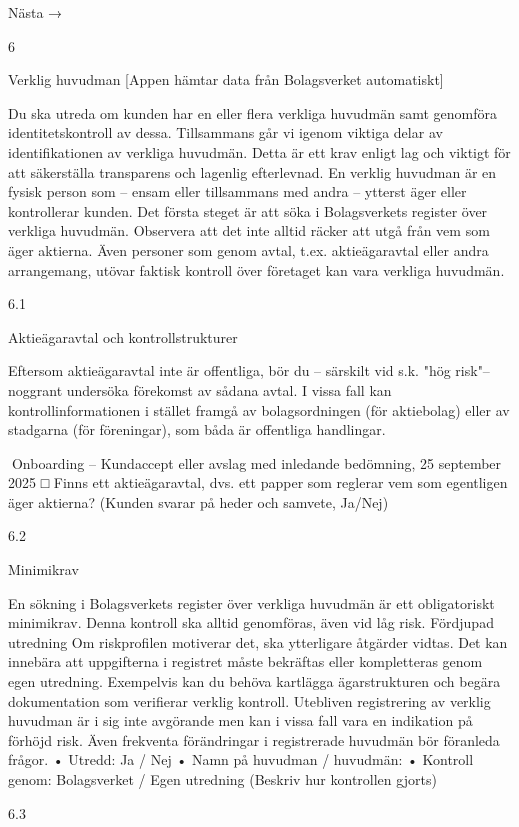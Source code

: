 Nästa →

6

Verklig huvudman [Appen hämtar data från Bolagsverket automatiskt]

Du ska utreda om kunden har en eller flera verkliga huvudmän samt genomföra identitetskontroll av dessa. Tillsammans går vi igenom viktiga delar av identifikationen av verkliga
huvudmän. Detta är ett krav enligt lag och viktigt för att säkerställa transparens och
lagenlig efterlevnad.
En verklig huvudman är en fysisk person som – ensam eller tillsammans med andra
– ytterst äger eller kontrollerar kunden. Det första steget är att söka i Bolagsverkets
register över verkliga huvudmän.
Observera att det inte alltid räcker att utgå från vem som äger aktierna. Även personer
som genom avtal, t.ex. aktieägaravtal eller andra arrangemang, utövar faktisk kontroll över
företaget kan vara verkliga huvudmän.

6.1

Aktieägaravtal och kontrollstrukturer

Eftersom aktieägaravtal inte är offentliga, bör du – särskilt vid s.k. "hög risk"– noggrant
undersöka förekomst av sådana avtal. I vissa fall kan kontrollinformationen i stället framgå av bolagsordningen (för aktiebolag) eller av stadgarna (för föreningar), som båda är
offentliga handlingar.

Onboarding – Kundaccept eller avslag med inledande bedömning,
25 september 2025
□ Finns ett aktieägaravtal, dvs. ett papper som reglerar vem som egentligen äger aktierna?
(Kunden svarar på heder och samvete, Ja/Nej)

6.2

Minimikrav

En sökning i Bolagsverkets register över verkliga huvudmän är ett obligatoriskt minimikrav. Denna kontroll ska alltid genomföras, även vid låg risk.
Fördjupad utredning
Om riskprofilen motiverar det, ska ytterligare åtgärder vidtas. Det kan innebära att
uppgifterna i registret måste bekräftas eller kompletteras genom egen utredning. Exempelvis kan du behöva kartlägga ägarstrukturen och begära dokumentation som verifierar
verklig kontroll.
Utebliven registrering av verklig huvudman är i sig inte avgörande men kan i vissa fall
vara en indikation på förhöjd risk. Även frekventa förändringar i registrerade huvudmän
bör föranleda frågor.
• Utredd: Ja / Nej
• Namn på huvudman / huvudmän:
• Kontroll genom: Bolagsverket / Egen utredning (Beskriv hur kontrollen gjorts)

6.3

